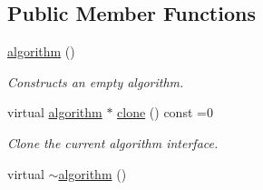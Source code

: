 \subsection*{Public Member Functions}
\begin{DoxyCompactItemize}
\item 
\hyperlink{classmerlin_1_1algorithm_adf0585fe727915bdae253d0213c0db80}{algorithm} ()\hypertarget{classmerlin_1_1algorithm_adf0585fe727915bdae253d0213c0db80}{}\label{classmerlin_1_1algorithm_adf0585fe727915bdae253d0213c0db80}

\begin{DoxyCompactList}\small\item\em Constructs an empty algorithm. \end{DoxyCompactList}\item 
virtual \hyperlink{classmerlin_1_1algorithm}{algorithm} $\ast$ \hyperlink{classmerlin_1_1algorithm_a10f787e24c1fd5ec92c26b18efb0b8db}{clone} () const =0
\begin{DoxyCompactList}\small\item\em Clone the current algorithm interface. \end{DoxyCompactList}\item 
virtual \hyperlink{classmerlin_1_1algorithm_a15a4cf8bb6ed1dc1de3a9e7383c2bbc1}{$\sim$algorithm} ()\hypertarget{classmerlin_1_1algorithm_a15a4cf8bb6ed1dc1de3a9e7383c2bbc1}{}\label{classmerlin_1_1algorithm_a15a4cf8bb6ed1dc1de3a9e7383c2bbc1}


\end{DoxyCompactItemize}

